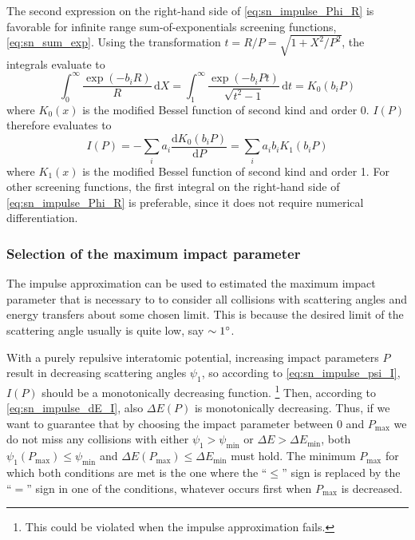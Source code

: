 The second expression on the right-hand side of \cref{eq:sn_impulse_Phi_R} is favorable for infinite range sum-of-exponentials screening functions, \cref{eq:sn_sum_exp}. Using the transformation $t = R/P = \sqrt{1 + X^2/P^2}$, the integrals evaluate to \cite[8.432.3]{Gra80}
%
\begin{equation*}
    \int_0^\infty \frac{\exp(-b_i R)}{R} \, \mathrm{d}X
    = \int_{1}^{\infty} \frac{\exp (-b_i P t)}{\sqrt{t^2 - 1}} \, \mathrm{d}t
    = K_0(b_i P)
\end{equation*}
%
where $K_0(x)$ is the modified Bessel function of second kind and order 0. $I(P)$ therefore evaluates to
%
\begin{equation}
    I(P) = - \sum_i a_i \frac{\mathrm{d} K_0(b_i P)}{\mathrm{d} P}
    = \sum_i a_i b_i K_1(b_i P)
\end{equation}
%
where $K_1(x)$ is the modified Bessel function of second kind and order 1.
For other screening functions, the first integral on the right-hand side of \cref{eq:sn_impulse_Phi_R} is preferable, since it does not require numerical differentiation.

\subsubsection{Selection of the maximum impact parameter}
The impulse approximation can be used to estimated the maximum impact parameter that is necessary to to consider all collisions with scattering angles and energy transfers about some chosen limit.
This is because the desired limit of the scattering angle usually is quite low, say $\sim 1\degree$.

With a purely repulsive interatomic potential, increasing impact parameters $P$ result in decreasing scattering angles $\psi_1$, so according to \cref{eq:sn_impulse_psi_I}, $I(P)$ should be a monotonically decreasing function.%
%
\footnote{This could be violated when the impulse approximation fails.}
%
Then, according to \cref{eq:sn_impulse_dE_I}, also $\Delta E(P)$ is monotonically decreasing.
Thus, if we want to guarantee that by choosing the impact parameter between $0$ and $P_\mathrm{max}$ we do not miss any collisions with either $\psi_1 > \psi_\mathrm{min}$ or $\Delta E > \Delta E_\mathrm{min}$, both $\psi_1(P_\mathrm{max}) \le \psi_\mathrm{min}$ and $\Delta E(P_\mathrm{max}) \le \Delta E_\mathrm{min}$ must hold.
The minimum $P_\mathrm{max}$ for which both conditions are met is the one where the ``$\le$'' sign is replaced by the ``$=$'' sign in one of the conditions, whatever occurs first when $P_\mathrm{max}$ is decreased.

